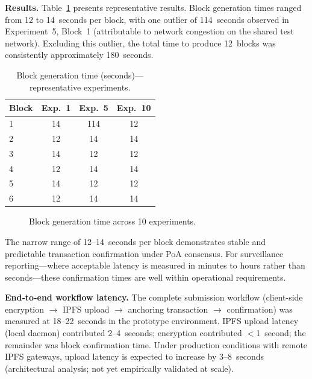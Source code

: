 \documentclass[AMA,LATO1COL]{WileyNJD-v2}
\begin{document}
\textbf{Results.} Table~\ref{tab:performance} presents representative results. Block generation times ranged from 12 to 14~seconds per block, with one outlier of 114~seconds observed in Experiment~5, Block~1 (attributable to network congestion on the shared test network). Excluding this outlier, the total time to produce 12~blocks was consistently approximately 180~seconds.

\begin{table}[!ht]
\caption{Block generation time (seconds)---representative experiments.}\label{tab:performance}
\begin{tabular*}{\columnwidth}{@{\extracolsep\fill}lccc@{}}
\toprule
Block & Exp.\ 1 & Exp.\ 5 & Exp.\ 10 \\
\midrule
1 & 14 & 114 & 12 \\
2 & 12 & 14 & 14 \\
3 & 14 & 12 & 12 \\
4 & 12 & 14 & 14 \\
5 & 14 & 12 & 12 \\
6 & 12 & 14 & 14 \\
\bottomrule
\end{tabular*}
\end{table}

\begin{figure}[!ht]
\centering
{}
\caption{Block generation time across 10 experiments.}\label{fig:performance}
\end{figure}

The narrow range of 12--14~seconds per block demonstrates stable and predictable transaction confirmation under PoA consensus. For surveillance reporting---where acceptable latency is measured in minutes to hours rather than seconds---these confirmation times are well within operational requirements.

\textbf{End-to-end workflow latency.} The complete submission workflow (client-side encryption $\rightarrow$ IPFS upload $\rightarrow$ anchoring transaction $\rightarrow$ confirmation) was measured at 18--22~seconds in the prototype environment. IPFS upload latency (local daemon) contributed 2--4~seconds; encryption contributed $<$1~second; the remainder was block confirmation time. Under production conditions with remote IPFS gateways, upload latency is expected to increase by 3--8~seconds (architectural analysis; not yet empirically validated at scale).
\end{document}
